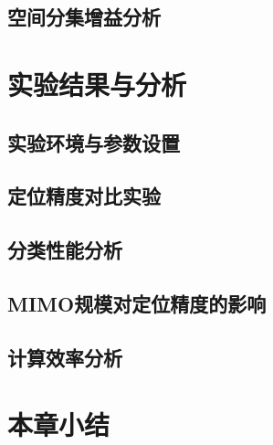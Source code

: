 
\subsection{空间分集增益分析}


\section{实验结果与分析}

\subsection{实验环境与参数设置}


\subsection{定位精度对比实验}


\subsection{分类性能分析}


\subsection{MIMO规模对定位精度的影响}


\subsection{计算效率分析}


\section{本章小结}

